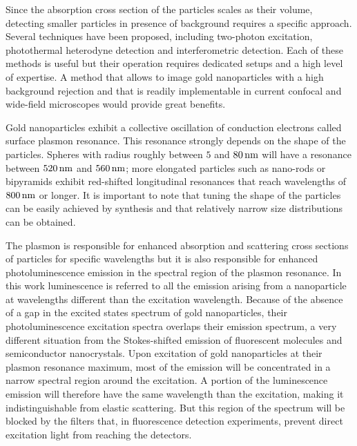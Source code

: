 Since the absorption cross section of the particles scales as their volume,
detecting smaller particles in presence of background requires a specific
approach. Several techniques have been proposed, including two-photon
excitation\cite{VandenBroek2013}, photothermal \mbox{heterodyne}
detection\cite{Berciaud2006} and interferometric detection\cite{Ignatovich2006}.
Each of these methods is useful but their operation requires dedicated setups
and a high level of expertise. A method that allows to image gold nanoparticles
with a high background rejection and that is readily implementable in current
confocal and wide-field microscopes would provide great benefits.

Gold nanoparticles exhibit a collective oscillation of conduction electrons
called surface plasmon resonance\cite{Bouhelier2005}. This resonance strongly
depends on the shape of the particles\cite{Dulkeith2004,Link2000a}.
Spheres with radius roughly between $5$ and $80\,\textrm{nm}$ will have a resonance
between $520\,\textrm{nm}$ and $560\,\textrm{nm}$; more elongated particles such as nano-rods or
bipyramids\cite{Rao2015} exhibit red-shifted longitudinal resonances that reach
wavelengths of $800\,\textrm{nm}$ or longer\cite{Ngoc2015}. It is important to note that
tuning the shape of the particles can be easily achieved by synthesis and that
relatively narrow size distributions can be obtained\cite{Nikoobakht2003}.

The plasmon is responsible for enhanced absorption and scattering cross
sections\cite{Ni2008} of particles for specific wavelengths but it is also
responsible for enhanced photoluminescence emission in the spectral region of
the plasmon resonance. In this work luminescence is referred to all the
emission arising from a nanoparticle at wavelengths different than the
excitation wavelength. Because of the absence of a gap in the excited states
spectrum of gold nanoparticles, their photoluminescence excitation spectra
overlaps their emission spectrum\cite{Yorulmaz2012}, a very different situation
from the Stokes-shifted emission of fluorescent molecules and semiconductor
nanocrystals. Upon excitation of gold nanoparticles at their plasmon resonance
maximum, most of the emission will be concentrated in a narrow spectral region
around the excitation. A portion of the luminescence emission will
therefore have the same wavelength than the excitation, making it
indistinguishable from elastic scattering. But this region of the spectrum will
be blocked by the filters that, in fluorescence detection experiments, prevent
direct excitation light from reaching the detectors.

